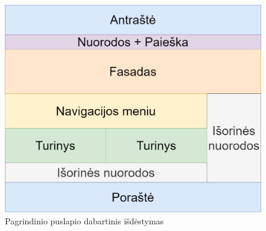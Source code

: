 \documentclass{VUMIFPSkursinis}
\begin{document}
\begin{figure}[htb]
    \centering
    \includegraphics[scale=0.25]{img/PuslapioArchPagrindinisDabartinis}
    \caption{Pagrindinio puslapio dabartinis išdėstymas}
    \label{img:PuslapioArchPagrindinisDabartinis}
\end{figure}


\end{document}
